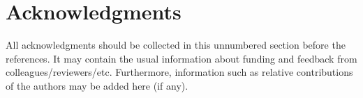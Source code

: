 \documentclass[article]{jdssv}\usepackage[]{graphicx}\usepackage[]{color}
\begin{document}
\section*{Acknowledgments}

All acknowledgments should be collected in this
unnumbered section before the references. It may contain the usual information
about funding and feedback from colleagues/reviewers/etc. Furthermore,
information such as relative contributions of the authors may be added here
(if any).







% 
% 
% 
% 

\end{document}
